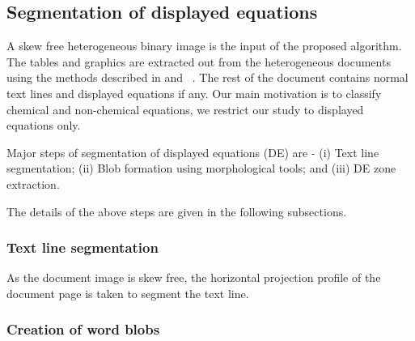 \documentclass[conference]{IEEEtran}
\begin{document}
\subsection{Segmentation of
displayed equations} A skew free heterogeneous binary image is the input of the proposed algorithm. The tables and graphics are
extracted out from the heterogeneous documents using the methods described in \cite{sekhar_06} and ~\cite{spc_07}. The rest of
the document contains normal text lines and displayed equations if any. Our main motivation is to classify chemical and non-chemical equations, we restrict our study to displayed equations only.

Major steps of segmentation of displayed equations (DE) are -  (i) Text line segmentation; (ii) Blob formation using morphological tools; and (iii) DE zone extraction.


The details of the above steps are given in the following subsections.

\subsubsection{Text line segmentation} 
As the document image is skew free, the horizontal projection profile of the document page is taken to segment the
text line. %

\subsubsection{Creation of word blobs} 
\end{document}
